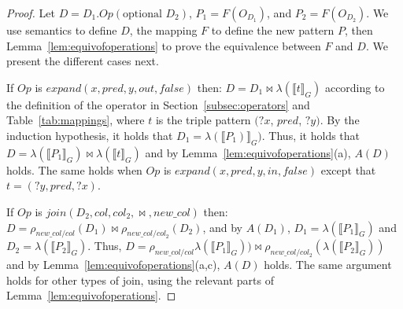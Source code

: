\begin{proof}
 Let $D = D_1.Op(\text{optional } D_2)$, $P_1 = F(O_{D_1})$, and $P_2 = F(O_{D_2})$.
We use \rdfframes semantics to define $D$, the mapping $F$ to define the new pattern $P$, then 
Lemma~\ref{lem:equivofoperations} to prove the equivalence between $F$ and $D$.
We present the different cases next.
\squishlist
    \item If $Op$ is $expand(x, pred, y, out, false)$ then: $D = D_1 \Join \lambda(\llbracket t\rrbracket_G)$ according to the definition of the operator in Section~\ref{subsec:operators} and Table~\ref{tab:mappings}, where $t$ is the triple pattern $(?x$, $pred$, $?y)$. By the induction hypothesis, it holds that $D_1 = \lambda(\llbracket P_1)\rrbracket_G)$. 
    Thus, it holds that $D = \lambda(\llbracket P_1\rrbracket_G) \Join \lambda(\llbracket t \rrbracket_G)$ and by Lemma~\ref{lem:equivofoperations}(a), $A(D)$ holds.
    The same holds when $Op$ is $expand(x, pred, y, in, false)$ except that $t=(?y, pred, ?x)$.


    \begin{sloppypar}
    \item If $Op$ is $join(D_2, col, col_2, \Join, new\_col)$ then:
    $D = \rho_{new\_col/col}(D_1) \Join \rho_{new\_col/col_2}(D_2) $, and by $A(D_1)$, $D_1 = \lambda(\llbracket P_1\rrbracket_G)$ and $D_2 = \lambda(\llbracket P_2\rrbracket_G)$. Thus, $D = \rho_{new\_col/col}\lambda(\llbracket P_1\rrbracket_G)) 
    \Join \rho_{new\_col/col_2}(\lambda(\llbracket P_2\rrbracket_G))$ and by  Lemma~\ref{lem:equivofoperations}(a,c), $A(D)$ holds. The same argument holds for other types of join, using the relevant parts of Lemma~\ref{lem:equivofoperations}.
    \end{sloppypar}
    

\end{proof}
